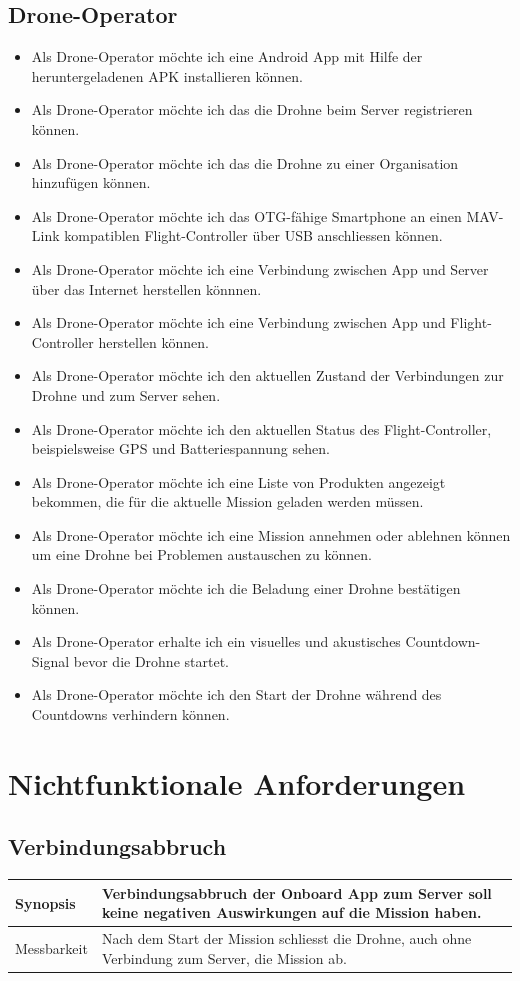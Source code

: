 \subsection{Drone-Operator}
\begin{itemize}
	\item Als Drone-Operator möchte ich eine Android App mit Hilfe der heruntergeladenen \Gls{APK} installieren können.
	\item Als Drone-Operator möchte ich das die Drohne beim Server registrieren können.
	\item Als Drone-Operator möchte ich das die Drohne zu einer Organisation hinzufügen können.
	\item Als Drone-Operator möchte ich das \Gls{OTG}-fähige Smartphone an einen MAV-Link kompatiblen Flight-Controller über USB anschliessen können.
	\item Als Drone-Operator möchte ich eine Verbindung zwischen App und Server über das Internet herstellen könnnen.
	\item Als Drone-Operator möchte ich eine Verbindung zwischen App und Flight-Controller herstellen können.
	\item Als Drone-Operator möchte ich den aktuellen Zustand der Verbindungen zur Drohne und zum Server sehen.
	\item Als Drone-Operator möchte ich den aktuellen Status des \Gls{Flight-Controller}, beispielsweise GPS und Batteriespannung sehen.
	\item Als Drone-Operator möchte ich eine Liste von Produkten angezeigt bekommen, die für die aktuelle Mission geladen werden müssen.
	\item Als Drone-Operator möchte ich eine Mission annehmen oder ablehnen können um eine Drohne bei Problemen austauschen zu können.
	\item Als Drone-Operator möchte ich die Beladung einer Drohne bestätigen können.
	\item Als Drone-Operator erhalte ich ein visuelles und akustisches Countdown-Signal bevor die Drohne startet.
	\item Als Drone-Operator möchte ich den Start der Drohne während des Countdowns verhindern können.
\end{itemize}
\newpage
\section{Nichtfunktionale Anforderungen}
\subsection{Verbindungsabbruch}
\begin{tabular}{|p{}|p{}|} \hline
	Synopsis & Verbindungsabbruch der Onboard App zum Server soll keine negativen Auswirkungen auf die Mission haben.  \\ \hline
		
	Messbarkeit & Nach dem Start der Mission schliesst die Drohne, auch ohne Verbindung zum Server, die Mission ab. \\ \hline
\end{tabular}

